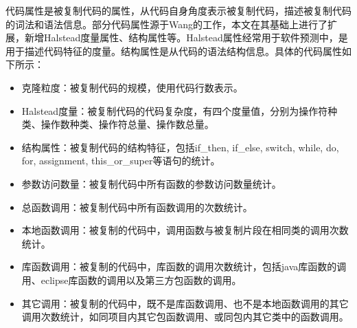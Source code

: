 代码属性是被复制代码的属性，从代码自身角度表示被复制代码，描述被复制代码的词法和语法信息。部分代码属性源于Wang的工作，本文在其基础上进行了扩展，新增Halstead度量属性、结构属性等。Halstead属性经常用于软件预测中，是用于描述代码特征的度量。结构属性是从代码的语法结构信息。具体的代码属性如下所示：
\begin{itemize}
\item 克隆粒度：被复制代码的规模，使用代码行数表示。
\item Halstead度量：被复制代码的代码复杂度，有四个度量值，分别为操作符种类、操作数种类、操作符总量、操作数总量。
\item  结构属性：被复制代码的结构特征，包括if\_then, if\_else, switch, while, do, for, assignment, this\_or\_super等语句的统计。
\item  参数访问数量：被复制代码中所有函数的参数访问数量统计。
\item  总函数调用：被复制代码中所有函数调用的次数统计。
\item  本地函数调用：被复制的代码中，调用函数与被复制片段在相同类的调用次数统计。
\item  库函数调用：被复制的代码中，库函数的调用次数统计，包括java库函数的调用、eclipse库函数的调用以及第三方包函数的调用。
\item  其它调用：被复制的代码中，既不是库函数调用、也不是本地函数调用的其它调用次数统计，如同项目内其它包函数调用、或同包内其它类中的函数调用。
\end{itemize}

